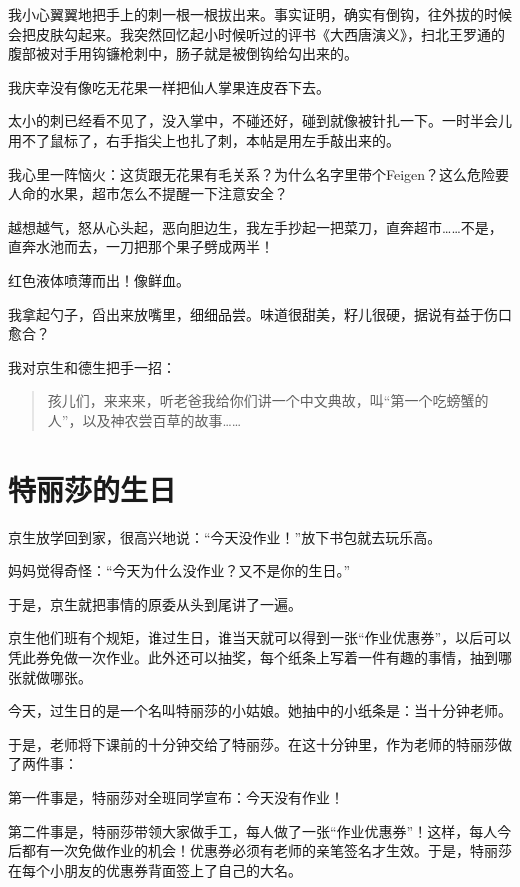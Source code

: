 \documentclass[twoside,openright,headings=optiontohead]{ctexbook} %
\begin{document}
{我小心翼翼地把手上的刺一根一根拔出来。事实证明，确实有倒钩，往外拔的时候会把皮肤勾起来。我突然回忆起小时候听过的评书《大西唐演义》，扫北王罗通的腹部被对手用钩镰枪刺中，肠子就是被倒钩给勾出来的。

我庆幸没有像吃无花果一样把仙人掌果连皮吞下去。

太小的刺已经看不见了，没入掌中，不碰还好，碰到就像被针扎一下。一时半会儿用不了鼠标了，右手指尖上也扎了刺，本帖是用左手敲出来的。

我心里一阵恼火：这货跟无花果有毛关系？为什么名字里带个Feigen？这么危险要人命的水果，超市怎么不提醒一下注意安全？

越想越气，怒从心头起，恶向胆边生，我左手抄起一把菜刀，直奔超市\ldots{}\ldots{}不是，直奔水池而去，一刀把那个果子劈成两半！

红色液体喷薄而出！像鲜血。

我拿起勺子，舀出来放嘴里，细细品尝。味道很甜美，籽儿很硬，据说有益于伤口愈合？

我对京生和德生把手一招：

\begin{quote}
孩儿们，来来来，听老爸我给你们讲一个中文典故，叫``第一个吃螃蟹的人''，以及神农尝百草的故事\ldots{}\ldots{}
\end{quote}

\chapter*{特丽莎的生日}\label{theresa}

京生放学回到家，很高兴地说：``今天没作业！''放下书包就去玩乐高。

妈妈觉得奇怪：``今天为什么没作业？又不是你的生日。''

于是，京生就把事情的原委从头到尾讲了一遍。

京生他们班有个规矩，谁过生日，谁当天就可以得到一张``作业优惠券''，以后可以凭此券免做一次作业。此外还可以抽奖，每个纸条上写着一件有趣的事情，抽到哪张就做哪张。

今天，过生日的是一个名叫特丽莎的小姑娘。她抽中的小纸条是：当十分钟老师。

于是，老师将下课前的十分钟交给了特丽莎。在这十分钟里，作为老师的特丽莎做了两件事：

第一件事是，特丽莎对全班同学宣布：今天没有作业！

第二件事是，特丽莎带领大家做手工，每人做了一张``作业优惠券''！这样，每人今后都有一次免做作业的机会！优惠券必须有老师的亲笔签名才生效。于是，特丽莎在每个小朋友的优惠券背面签上了自己的大名。

}
\end{document}

